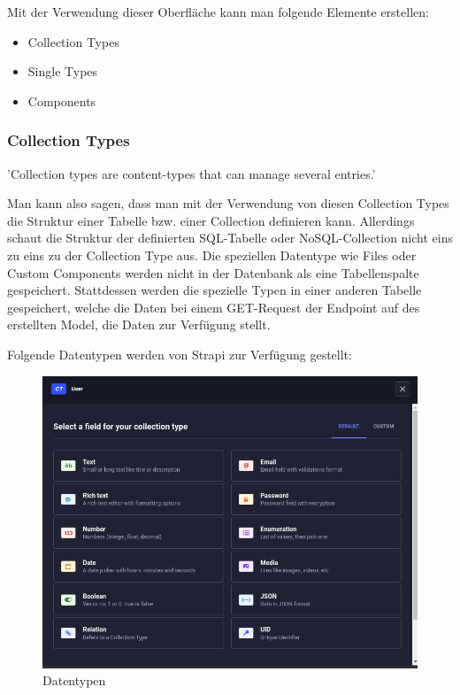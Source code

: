 Mit der Verwendung dieser Oberfläche kann man folgende Elemente erstellen:
\begin{itemize}
  \item Collection Types
  \item Single Types
  \item Components
\end{itemize}

\subsubsection{Collection Types}

'Collection types are content-types that can manage several entries.'
\cite{collection-types}

Man kann also sagen, dass man mit der Verwendung von diesen Collection Types die Struktur einer Tabelle bzw. einer Collection definieren kann.
Allerdings schaut die Struktur der definierten SQL-Tabelle oder NoSQL-Collection nicht eins zu eins zu der Collection Type aus.
Die speziellen Datentype wie Files oder Custom Components werden nicht in der Datenbank als eine Tabellenspalte gespeichert.
Stattdessen werden die spezielle Typen in einer anderen Tabelle gespeichert, welche die Daten bei einem GET-Request der Endpoint  auf des erstellten Model, die Daten zur Verfügung stellt.

Folgende Datentypen  werden von Strapi zur Verfügung gestellt:

\begin{figure}[H]
  \centering
  \includegraphics[width=\textwidth]{./pics/datatypes}
  \caption{Datentypen}
  \label{datatypes}
\end{figure}

